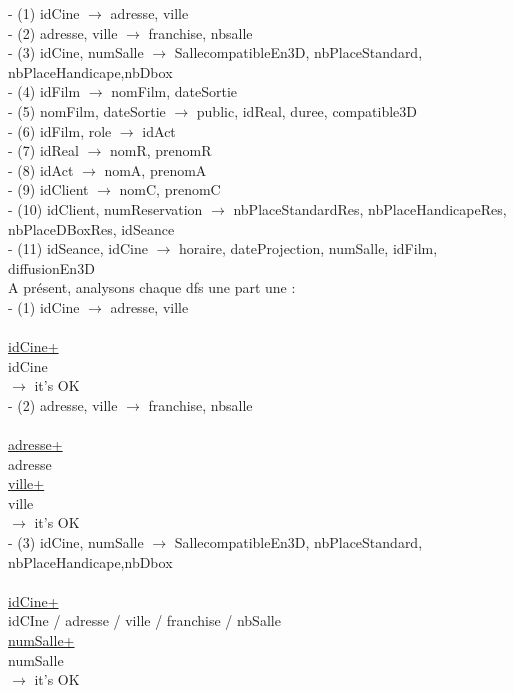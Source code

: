\documentclass[a4paper,sffamily,12pt]{article}
\begin{document}
				\noindent- (1) idCine $\rightarrow$ adresse, ville \\
				- (2) adresse, ville $\rightarrow$ franchise, nbsalle \\
				- (3) idCine, numSalle $\rightarrow$ SallecompatibleEn3D, nbPlaceStandard, nbPlaceHandicape,nbDbox \\
		 		- (4) idFilm $\rightarrow$ nomFilm, dateSortie \\
				- (5) nomFilm, dateSortie $\rightarrow$ public, idReal, duree, compatible3D \\
				- (6) idFilm, role $\rightarrow$  idAct \\
				- (7) idReal $\rightarrow$ nomR, prenomR \\
				- (8) idAct $\rightarrow$ nomA, prenomA \\
				- (9) idClient $\rightarrow$ nomC, prenomC \\
				- (10) idClient, numReservation $\rightarrow$ nbPlaceStandardRes, nbPlaceHandicapeRes, nbPlaceDBoxRes, idSeance \\
				- (11) idSeance, idCine $\rightarrow$ horaire, dateProjection, numSalle, idFilm, diffusionEn3D \\
				
				\noindent A présent, analysons chaque dfs une part une : \\
				
				\noindent - (1) idCine $\rightarrow$ adresse, ville \\
					\\
					\underline{idCine+} \\
					idCine\\									
				$\rightarrow$ it's OK \\		
					
				\noindent - (2) adresse, ville $\rightarrow$ franchise, nbsalle \\
					\\
					\underline{adresse+} \\
					adresse\\
					\underline{ville+} \\
					ville \\									
				$\rightarrow$ it's OK \\
				
				\noindent - (3) idCine, numSalle $\rightarrow$ SallecompatibleEn3D, nbPlaceStandard, nbPlaceHandicape,nbDbox \\
					\\
					\underline{idCine+} \\
					idCIne / adresse / ville / franchise / nbSalle\\
					\underline{numSalle+} \\
					numSalle \\								
				$\rightarrow$ it's OK \\													
\end{document}
